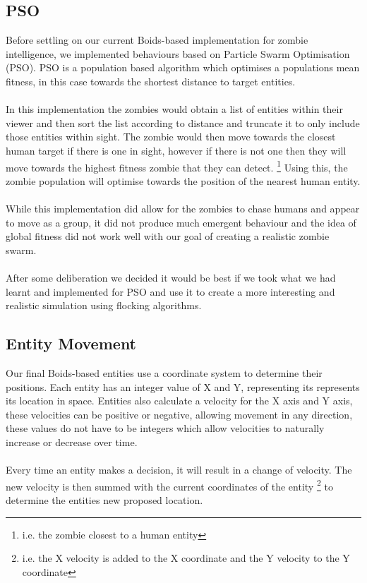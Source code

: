 \documentclass[10pt, a4paper, conference, compsocconf]{IEEEtran}
\begin{document}
\subsection{PSO \label{pso}}
Before settling on our current Boids-based implementation for zombie intelligence, we implemented behaviours based on Particle Swarm Optimisation\cite{pso} (PSO). PSO is a population based algorithm which optimises a populations mean fitness, in this case towards the shortest distance to target entities.\\
\\
In this implementation the zombies would obtain a list of entities within their viewer and then sort the list according to distance and truncate it to only include those entities within sight. The zombie would then move towards the closest human target if there is one in sight, however if there is not one then they will move towards the highest fitness zombie that they can detect. \footnote{i.e. the zombie closest to a human entity} Using this, the zombie population will optimise towards the position of the nearest human entity.\\
\\
While this implementation did allow for the zombies to chase humans and appear to move as a group, it did not produce much emergent behaviour and the idea of global fitness did not work well with our goal of creating a realistic zombie swarm.\\
\\
After some deliberation we decided it would be best if we took what we had learnt and implemented for PSO and use it to create a more interesting and realistic simulation using flocking algorithms.\\

\subsection{Entity Movement \label{movement}}
Our final Boids-based entities use a coordinate system to determine their positions. Each entity has an integer value of X and Y, representing its represents its location in space. Entities also calculate a velocity for the X axis and Y axis, these velocities can be positive or negative, allowing movement in any direction, these values do not have to be integers which allow velocities to naturally increase or decrease over time.\\
\\
Every time an entity makes a decision, it will result in a change of velocity. The new velocity is then summed with the current coordinates of the entity \footnote{i.e. the X velocity is added to the X coordinate and the Y velocity to the Y coordinate} to determine the entities new proposed location.\\
\end{document}
